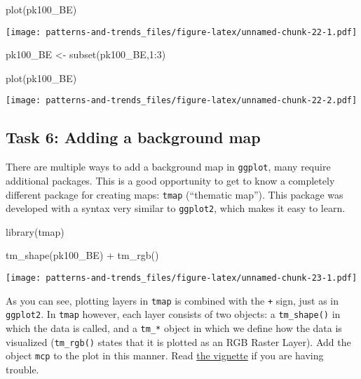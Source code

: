 \documentclass[
]{book}
\newenvironment{Shaded}{\begin{snugshade}}{\end{snugshade}}
\newcommand{\DecValTok}[1]{\textcolor[rgb]{0.00,0.00,0.81}{#1}}
\newcommand{\FunctionTok}[1]{\textcolor[rgb]{0.00,0.00,0.00}{#1}}
\newcommand{\NormalTok}[1]{#1}
\newcommand{\OtherTok}[1]{\textcolor[rgb]{0.56,0.35,0.01}{#1}}
\newcommand{\SpecialCharTok}[1]{\textcolor[rgb]{0.00,0.00,0.00}{#1}}
\begin{document}
\begin{Shaded}
\begin{Highlighting}[]

\FunctionTok{plot}\NormalTok{(pk100\_BE)}
\end{Highlighting}
\end{Shaded}

\texttt{[image: patterns-and-trends\_files/figure-latex/unnamed-chunk-22-1.pdf]}

\begin{Shaded}
\begin{Highlighting}[]

\NormalTok{pk100\_BE }\OtherTok{\textless{}{-}} \FunctionTok{subset}\NormalTok{(pk100\_BE,}\DecValTok{1}\SpecialCharTok{:}\DecValTok{3}\NormalTok{)}

\FunctionTok{plot}\NormalTok{(pk100\_BE)}
\end{Highlighting}
\end{Shaded}

\texttt{[image: patterns-and-trends\_files/figure-latex/unnamed-chunk-22-2.pdf]}

\hypertarget{task-6-adding-a-background-map}{%
\subsection{Task 6: Adding a background map}\label{task-6-adding-a-background-map}}

There are multiple ways to add a background map in \texttt{ggplot}, many require additional packages. This is a good opportunity to get to know a completely different package for creating maps: \texttt{tmap} (``thematic map''). This package was developed with a syntax very similar to \texttt{ggplot2}, which makes it easy to learn.

\begin{Shaded}
\begin{Highlighting}[]
\FunctionTok{library}\NormalTok{(tmap)}

\FunctionTok{tm\_shape}\NormalTok{(pk100\_BE) }\SpecialCharTok{+} 
  \FunctionTok{tm\_rgb}\NormalTok{() }
\end{Highlighting}
\end{Shaded}

\texttt{[image: patterns-and-trends\_files/figure-latex/unnamed-chunk-23-1.pdf]}

As you can see, plotting layers in \texttt{tmap} is combined with the \texttt{+} sign, just as in \texttt{ggplot2}. In \texttt{tmap} however, each layer consists of two objects: a \texttt{tm\_shape()} in which the data is called, and a \texttt{tm\_*} object in which we define how the data is visualized (\texttt{tm\_rgb()} states that it is plotted as an RGB Raster Layer). Add the object \texttt{mcp} to the plot in this manner. Read \href{https://cran.r-project.org/web/packages/tmap/vignettes/tmap-getstarted.html}{the vignette} if you are having trouble.
\end{document}
